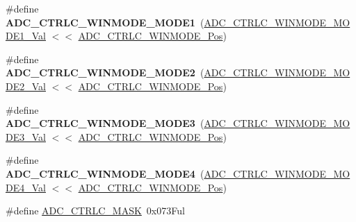 \begin{DoxyCompactItemize}
\item 
\hypertarget{group___s_a_m_l21___a_d_c_ga3e7080ba09c4cb3b2b2902cbc3f2f8ad}{}\#define {\bfseries A\+D\+C\+\_\+\+C\+T\+R\+L\+C\+\_\+\+W\+I\+N\+M\+O\+D\+E\+\_\+\+M\+O\+D\+E1}~(\hyperlink{group___s_a_m_l21___a_d_c_gaa0a1cde0540a1b9dc8583433a86f51b9}{A\+D\+C\+\_\+\+C\+T\+R\+L\+C\+\_\+\+W\+I\+N\+M\+O\+D\+E\+\_\+\+M\+O\+D\+E1\+\_\+\+Val}   $<$$<$ \hyperlink{group___s_a_m_l21___a_d_c_ga8a34af6e2a3244ddd1ffc8e1f6b78f42}{A\+D\+C\+\_\+\+C\+T\+R\+L\+C\+\_\+\+W\+I\+N\+M\+O\+D\+E\+\_\+\+Pos})\label{group___s_a_m_l21___a_d_c_ga3e7080ba09c4cb3b2b2902cbc3f2f8ad}

\item 
\hypertarget{group___s_a_m_l21___a_d_c_gaec8d98aa6b4339e0ee9994503c6881fa}{}\#define {\bfseries A\+D\+C\+\_\+\+C\+T\+R\+L\+C\+\_\+\+W\+I\+N\+M\+O\+D\+E\+\_\+\+M\+O\+D\+E2}~(\hyperlink{group___s_a_m_l21___a_d_c_ga0c11f6418ce8769e29ef3c56823c6445}{A\+D\+C\+\_\+\+C\+T\+R\+L\+C\+\_\+\+W\+I\+N\+M\+O\+D\+E\+\_\+\+M\+O\+D\+E2\+\_\+\+Val}   $<$$<$ \hyperlink{group___s_a_m_l21___a_d_c_ga8a34af6e2a3244ddd1ffc8e1f6b78f42}{A\+D\+C\+\_\+\+C\+T\+R\+L\+C\+\_\+\+W\+I\+N\+M\+O\+D\+E\+\_\+\+Pos})\label{group___s_a_m_l21___a_d_c_gaec8d98aa6b4339e0ee9994503c6881fa}

\item 
\hypertarget{group___s_a_m_l21___a_d_c_ga6df0a18e90cae4db06e3a8c455a1b4c0}{}\#define {\bfseries A\+D\+C\+\_\+\+C\+T\+R\+L\+C\+\_\+\+W\+I\+N\+M\+O\+D\+E\+\_\+\+M\+O\+D\+E3}~(\hyperlink{group___s_a_m_l21___a_d_c_ga51e227ad259e20ee67c222eef6b22354}{A\+D\+C\+\_\+\+C\+T\+R\+L\+C\+\_\+\+W\+I\+N\+M\+O\+D\+E\+\_\+\+M\+O\+D\+E3\+\_\+\+Val}   $<$$<$ \hyperlink{group___s_a_m_l21___a_d_c_ga8a34af6e2a3244ddd1ffc8e1f6b78f42}{A\+D\+C\+\_\+\+C\+T\+R\+L\+C\+\_\+\+W\+I\+N\+M\+O\+D\+E\+\_\+\+Pos})\label{group___s_a_m_l21___a_d_c_ga6df0a18e90cae4db06e3a8c455a1b4c0}

\item 
\hypertarget{group___s_a_m_l21___a_d_c_ga47844b1de16f26d5a49175203e0e57c6}{}\#define {\bfseries A\+D\+C\+\_\+\+C\+T\+R\+L\+C\+\_\+\+W\+I\+N\+M\+O\+D\+E\+\_\+\+M\+O\+D\+E4}~(\hyperlink{group___s_a_m_l21___a_d_c_ga716a8e82c6c30c8d44143b74b2e2e4da}{A\+D\+C\+\_\+\+C\+T\+R\+L\+C\+\_\+\+W\+I\+N\+M\+O\+D\+E\+\_\+\+M\+O\+D\+E4\+\_\+\+Val}   $<$$<$ \hyperlink{group___s_a_m_l21___a_d_c_ga8a34af6e2a3244ddd1ffc8e1f6b78f42}{A\+D\+C\+\_\+\+C\+T\+R\+L\+C\+\_\+\+W\+I\+N\+M\+O\+D\+E\+\_\+\+Pos})\label{group___s_a_m_l21___a_d_c_ga47844b1de16f26d5a49175203e0e57c6}

\item 
\hypertarget{group___s_a_m_l21___a_d_c_gaec7a38d6183df52fa44ffd2b5ea4a4ca}{}\#define \hyperlink{group___s_a_m_l21___a_d_c_gaec7a38d6183df52fa44ffd2b5ea4a4ca}{A\+D\+C\+\_\+\+C\+T\+R\+L\+C\+\_\+\+M\+A\+S\+K}~0x073\+Ful\label{group___s_a_m_l21___a_d_c_gaec7a38d6183df52fa44ffd2b5ea4a4ca}


\end{DoxyCompactItemize}
